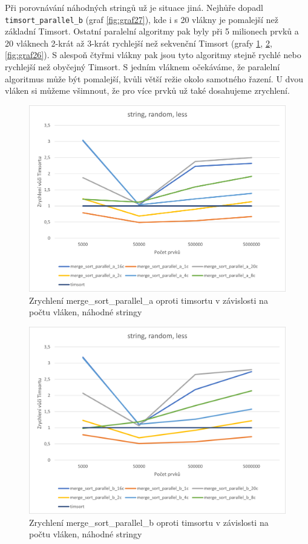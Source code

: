 \documentclass[thesis=B,czech]{FITthesis}[2019/12/23]
\begin{document}
Při porovnávání náhodných stringů už je situace jiná. Nejhůře dopadl \texttt{timsort\_parallel\_b} (graf \ref{fig:graf27}), kde i s 20 vlákny je pomalejší než základní Timsort. Ostatní paralelní algoritmy pak byly při 5 milionech prvků a 20 vláknech 2-krát až 3-krát rychlejší než sekvenční Timsort (grafy \ref{fig:graf24}, \ref{fig:graf25}, \ref{fig:graf26}). S alespoň čtyřmi vlákny pak jsou tyto algoritmy stejně rychlé nebo rychlejší než obyčejný Timsort. S jedním vláknem očekáváme, že paralelní algoritmus může být pomalejší, kvůli větší režie okolo samotného řazení. U dvou vláken si můžeme všimnout, že pro více prvků už také dosahujeme zrychlení.

\begin{figure}[htbp]\centering
	\includegraphics[width=13cm]{obrazky/graf24.png}
	\caption[Zrychlení merge\_sort\_parallel\_a oproti timsortu v závislosti na počtu vláken, náhodné stringy]{Zrychlení merge\_sort\_parallel\_a oproti timsortu v závislosti na počtu vláken, náhodné stringy}\label{fig:graf24}
\end{figure}
\begin{figure}[htbp]\centering
	\includegraphics[width=13cm]{obrazky/graf25.png}
	\caption[Zrychlení merge\_sort\_parallel\_b oproti timsortu v závislosti na počtu vláken, náhodné stringy]{Zrychlení merge\_sort\_parallel\_b oproti timsortu v závislosti na počtu vláken, náhodné stringy}\label{fig:graf25}
\end{figure}
\end{document}
